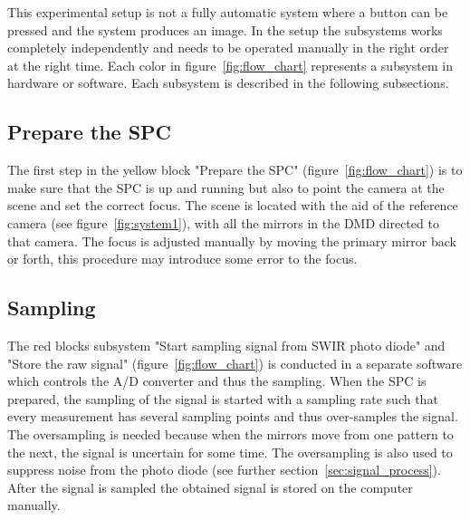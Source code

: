 This experimental setup is not a fully automatic system where a button can be pressed and the system produces an image. In the setup the subsystems works completely independently and needs to be operated manually in the right order at the right time. Each color in figure~\ref{fig:flow_chart} represents a subsystem in hardware or software. Each subsystem is described in the following subsections.

 
\subsection{Prepare the SPC}
\label{sec:p_spc}
The first step in the yellow block "Prepare the SPC" (figure~\ref{fig:flow_chart}) is to make sure that the SPC is up and running but also to point the camera at the scene and set the correct focus. The scene is located with the aid of the reference camera (see figure~\ref{fig:system1}), with all the mirrors in the DMD directed to that camera. The focus is adjusted manually by moving the primary mirror back or forth, this procedure may introduce some error to the focus.\\[0.1in]

\subsection{Sampling}
The red blocks subsystem "Start sampling signal from SWIR photo diode" and "Store the raw signal" (figure~\ref{fig:flow_chart}) is conducted in a separate software which controls the A/D converter and thus the sampling. When the SPC is prepared, the sampling of the signal is started with a sampling rate such that every measurement has several sampling points and thus over-samples the signal. The oversampling is needed because when the mirrors move from one pattern to the next, the signal is uncertain for some time. The oversampling is also used to suppress noise from the photo diode (see further section~\ref{sec:signal_process}). After the signal is sampled the obtained signal is stored on the computer manually.

